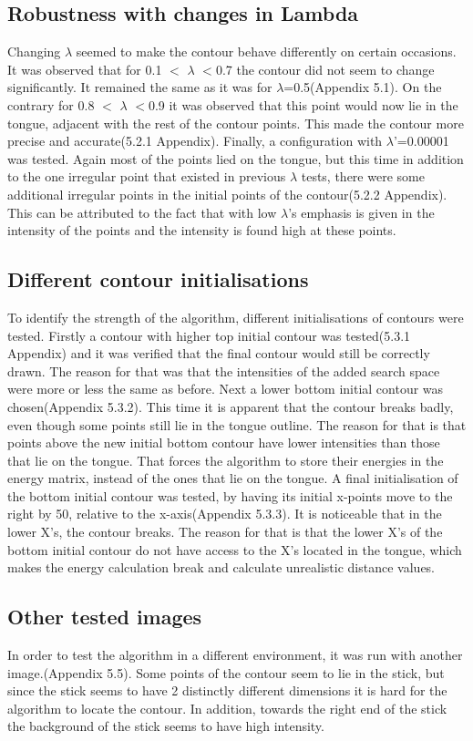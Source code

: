 \documentclass[12pt,a4paper,twocolumn]{article}
\begin{document}
\subsection{Robustness with changes in Lambda}
Changing $\lambda$ seemed to make the contour behave differently on certain occasions. 
It was observed that for 0.1 $<$ $\lambda$ $<$0.7 the contour did not seem to change significantly. It remained the same as it was for $\lambda$=0.5(Appendix 5.1).
On the contrary for 0.8 $<$ $\lambda$ $<$0.9 it was observed that this point would now lie in the tongue, adjacent with the rest of the contour points. This made the contour more precise and accurate(5.2.1 Appendix).
Finally, a configuration with $\lambda$'=0.00001 was tested. Again most of the points lied on the tongue, but this time in addition to the one irregular point that existed in previous $\lambda$ tests, there were some additional irregular points in the initial points of the contour(5.2.2 Appendix). This can be attributed to the fact that with low $\lambda$'s emphasis is given in the intensity of the points and the intensity is found high at these points.
\subsection{Different contour initialisations}
To identify the strength of the algorithm, different initialisations of contours were tested.
Firstly a contour with higher top initial contour was tested(5.3.1 Appendix) and it was verified that the final contour would still be correctly drawn. The reason for that was that the intensities of the added search space were more or less the same as before. Next a lower bottom initial contour was chosen(Appendix 5.3.2). This time it is apparent that the contour breaks badly, even though some points still lie in the tongue outline. The reason for that is that points above the new initial bottom contour have lower intensities than those that lie on the tongue. That forces the algorithm to store their energies in the energy matrix, instead of the ones that lie on the tongue. A final initialisation of the bottom initial contour was tested, by having its initial x-points move to the right by 50, relative to the x-axis(Appendix 5.3.3). It is noticeable that in the lower X's, the contour breaks. The reason for that is that the lower X's of the bottom initial contour do not have access to the X's located in the tongue, which makes the energy calculation break and calculate unrealistic distance values.
\subsection{Other tested images}
In order to test the algorithm in a different environment, it was run with another image.(Appendix 5.5). Some points of the contour seem to lie in the stick, but since the stick seems to have 2 distinctly different dimensions it is hard for the algorithm to locate the contour. In addition, towards the right end of the stick the background of the stick seems to have high intensity.
\end{document}
